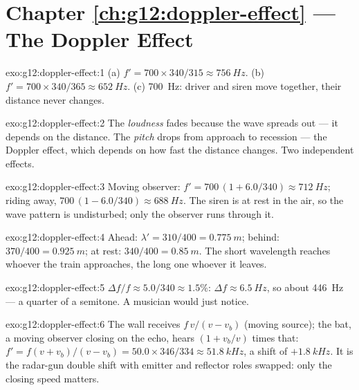 \section*{Chapter \ref{ch:g12:doppler-effect} --- The Doppler Effect}

\begin{solution}{exo:g12:doppler-effect:1}
(a) $f' = 700 \times 340/315 \approx \qty{756}{Hz}$.
(b) $f' = 700 \times 340/365 \approx \qty{652}{Hz}$.
(c) \qty{700}{Hz}: driver and siren move together, their distance never changes.
\end{solution}

\begin{solution}{exo:g12:doppler-effect:2}
The \emph{loudness} fades because the wave spreads out --- it depends on the distance.
The \emph{pitch} drops from approach to recession --- the Doppler effect, which depends
on how fast the distance changes. Two independent effects.
\end{solution}

\begin{solution}{exo:g12:doppler-effect:3}
Moving observer: $f' = 700\,(1 + 6.0/340) \approx \qty{712}{Hz}$; riding away,
$700\,(1 - 6.0/340) \approx \qty{688}{Hz}$. The siren is at rest in the air, so the wave
pattern is undisturbed; only the observer runs through it.
\end{solution}

\begin{solution}{exo:g12:doppler-effect:4}
Ahead: $\lambda' = 310/400 = \qty{0.775}{m}$; behind: $370/400 = \qty{0.925}{m}$; at
rest: $340/400 = \qty{0.85}{m}$. The short wavelength reaches whoever the train
approaches, the long one whoever it leaves.
\end{solution}

\begin{solution}{exo:g12:doppler-effect:5}
$\Delta f/f \approx 5.0/340 \approx 1.5\%$: $\Delta f \approx \qty{6.5}{Hz}$, so about
\qty{446}{Hz} --- a quarter of a semitone. A musician would just notice.
\end{solution}

\begin{solution}{exo:g12:doppler-effect:6}
The wall receives $f\,v/(v - v_b)$ (moving source); the bat, a moving observer closing on
the echo, hears $(1 + v_b/v)$ times that: $f' = f(v + v_b)/(v - v_b) = 50.0 \times
346/334 \approx \qty{51.8}{kHz}$, a shift of $+\qty{1.8}{kHz}$. It is the radar-gun
double shift with emitter and reflector roles swapped: only the closing speed matters.
\end{solution}

